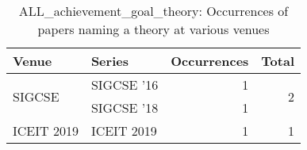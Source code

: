 \begin{table*}[t]
\begin{tabular}{llrr}
Venue & Series & Occurrences & Total\\\hline
\multirow{2}{*}{SIGCSE } & SIGCSE '16 & 1 & \multirow{2}{*}{2}\\
& SIGCSE '18 & 1 &\\
\multirow{1}{*}{ICEIT 2019} & ICEIT 2019 & 1 & \multirow{1}{*}{1}\\
\end{tabular}
\caption{ALL\_achievement\_goal\_theory: Occurrences of papers naming a theory at various venues}
\end{table*}